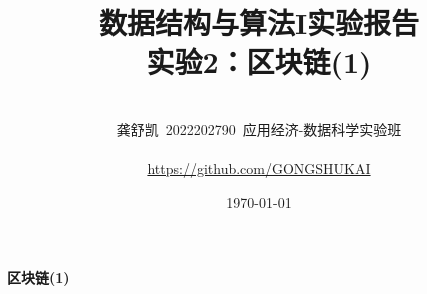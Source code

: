 \documentclass[10pt,a4paper]{article}
\begin{document}
	\title{{\Huge 数据结构与算法I实验报告{\large\linebreak\\}}{\huge 实验2：区块链(1)\linebreak\linebreak}}
	\vspace{3cm}
	\author{\\ \Large 龚舒凯\ 2022202790\ 应用经济-数据科学实验班\\
		\hfill\\
		\Large{\url{https://github.com/GONGSHUKAI}}\\
		\hfill}
	
	\date{\today}
	\maketitle
	\newpage
	\begin{center}
		{\huge \textbf{区块链(1)}}
	\end{center}
\end{document}
